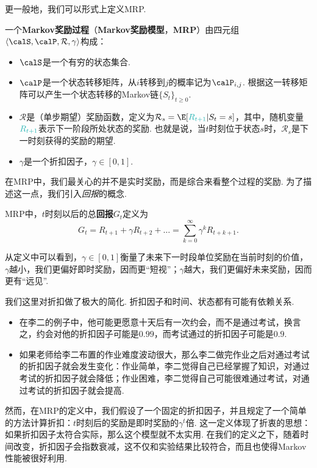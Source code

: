 更一般地，我们可以形式上定义MRP.

\begin{definition}
一个\textbf{Markov奖励过程}（\textbf{Markov奖励模型}，\textbf{MRP}）由四元组$\langle\calS,\calP,\mathcal R,\gamma\rangle$构成：
\begin{itemize}
    \item $\calS$是一个有穷的状态集合.
    \item $\calP$是一个状态转移矩阵，从$i$转移到$j$的概率记为$\calP_{i,j}$. 根据这一转移矩阵可以产生一个状态转移的Markov链$\{S_t\}_{t\geq 0}$.
    \item $\mathcal R$是（单步期望）奖励函数，定义为$\mathcal R_s = \E[\textcolor{TealBlue}{R_{t+1}}|S_t=s]$，其中，随机变量$\textcolor{TealBlue}{R_{t+1}}$表示下一阶段所处状态的奖励. 也就是说，当$t$时刻位于状态$s$时，$\mathcal R_s$是下一时刻获得的奖励的期望.
    \item $\gamma$是一个折扣因子，$\gamma\in[0,1]$.
\end{itemize}
\end{definition}

在MRP中，我们最关心的并不是实时奖励，而是综合来看整个过程的奖励. 为了描述这一点，我们引入\emph{回报}的概念.

\begin{definition}[回报]
MRP中，$t$时刻以后的总\textbf{回报}$G_t$定义为
    \[G_t = R_{t+1}+\gamma R_{t+2} +\dots =\sum_{k=0}^\infty \gamma^kR_{t+k+1}.\]    
\end{definition}
从定义中可以看到，$\gamma \in[0,1]$衡量了未来下一时段单位奖励在当前时刻的价值，$\gamma$越小，我们更偏好即时奖励，因而更“短视”；$\gamma$越大，我们更偏好未来奖励，因而更有“远见”.

我们这里对折扣做了极大的简化. 折扣因子和时间、状态都有可能有依赖关系. 
\begin{itemize}
    \item 在李二的例子中，他可能更愿意十天后有一次约会，而不是通过考试，换言之，约会对他的折扣因子可能是$0.99$，而考试通过的折扣因子可能是$0.9$.
    \item 如果老师给李二布置的作业难度波动很大，那么李二做完作业之后对通过考试的折扣因子就会发生变化：作业简单，李二觉得自己已经掌握了知识，对通过考试的折扣因子就会降低；作业困难，李二觉得自己可能很难通过考试，对通过考试的折扣因子就会提高.
\end{itemize}
然而，在MRP的定义中，我们假设了一个固定的折扣因子，并且规定了一个简单的方法计算折扣：$t$时刻后的奖励是即时奖励的$\gamma^t$倍. 这一定义体现了折衷的思想：如果折扣因子太符合实际，那么这个模型就不太实用. 在我们的定义之下，随着时间改变，折扣因子会指数衰减，这不仅和实验结果比较符合，而且也使得Markov性能被很好利用.

